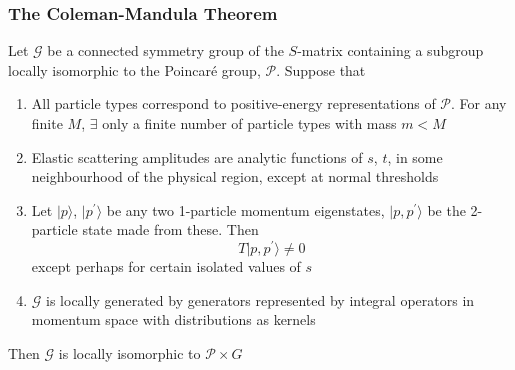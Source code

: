 \documentclass[10pt,aspectratio=169]{beamer}
\begin{document}
\begin{frame}
  \frametitle{The Coleman-Mandula Theorem}
  Let $\mathcal{G}$ be a connected symmetry group of the $S$-matrix
  containing a subgroup locally isomorphic to the Poincar\'{e} group,
  $\mathcal{P}$.  Suppose that
    \begin{enumerate}\itemsep1em
    \item All particle types correspond to positive-energy representations
      of $\mathcal{P}$.  For any finite $M$, $\exists$ only a finite number
      of particle types with mass $m < M$
    \item Elastic scattering amplitudes are analytic functions of $s$, $t$,
      in some neighbourhood of the physical region, except at normal
      thresholds
    \item Let $|p \rangle$, $| p^\prime \rangle$ be any two 1-particle
      momentum eigenstates, $|p, p^\prime \rangle$ be the 2-particle state
      made from these.  Then
      \begin{equation*}
        T|p, p^\prime\rangle \neq 0
      \end{equation*}
      except perhaps for certain isolated values of $s$
    \item $\mathcal{G}$ is locally generated by generators represented by
      integral operators in momentum space with distributions as kernels
    \end{enumerate}
    Then $\mathcal{G}$ is locally isomorphic to $\mathcal{P} \times G$
\end{frame}
\end{document}
